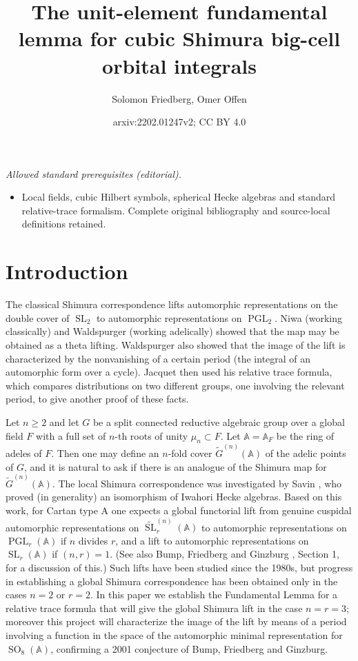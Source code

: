 \documentclass[12pt]{amsart}
\title{The unit-element fundamental lemma for cubic Shimura big-cell orbital integrals}
\author{Solomon Friedberg, Omer Offen}
\date{arxiv:2202.01247v2; CC BY 4.0}
\newcommand{\PGL}{\operatorname{PGL}}
\newcommand{\SL}{\operatorname{SL}}
\newcommand{\SO}{\operatorname{SO}}
\newcommand{\A}{\mathbb{A}}
\theoremstyle{remark}
\begin{document}
\maketitle
\noindent\textit{Allowed standard prerequisites (editorial).}\begin{itemize}
\item Local fields, cubic Hilbert symbols, spherical Hecke algebras and standard relative-trace formalism. Complete original bibliography and source-local definitions retained.
\end{itemize}\medskip
\section{Introduction} \label{intro}

The classical Shimura correspondence \cite{MR0332663} lifts automorphic representations on the double cover of $\SL_2$ to automorphic representations on $\PGL_2$.  Niwa \cite{MR0364106} (working classically) and 
Waldspurger \cite{MR577010} (working adelically) showed that the map may be obtained as a theta lifting. Waldspurger 
also showed that the image of the lift is characterized by the nonvanishing of a certain period (the integral of an automorphic form over a cycle). Jacquet \cite{MR983610} then used his relative trace formula, 
which compares distributions on two different groups, one involving the relevant period, to give another proof of these facts.  


Let  $n\geq2$ and let $G$ be a split connected reductive algebraic group over a global field $F$ with a full
set of $n$-th roots of unity $\mu_n\subset F$.  Let  $\A=\A_F$ be the ring of adeles of $F$. 
Then one may define an $n$-fold cover $\widetilde{G}^{(n)}(\mathbb{A})$ of the adelic points of $G$, and it is natural to ask if there is an analogue of the Shimura map for $\widetilde{G}^{(n)}(\mathbb{A})$. 
The local Shimura correspondence was investigated by Savin \cite{MR929534}, who proved (in generality) an isomorphism of Iwahori Hecke algebras.
Based on this work, for Cartan type A one expects a global functorial lift from genuine cuspidal automorphic representations on $\widetilde{\SL}_r^{(n)}(\A)$ to automorphic
representations on $\PGL_r(\A)$ if $n$ divides $r$, and a lift to automorphic representations on $\SL_r(\A)$ if $(n,r)=1$. (See also
 Bump, Friedberg and Ginzburg \cite{MR1882041}, Section 1, for a discussion of this.)   Such lifts have been studied since the 1980s,  but progress in establishing a global Shimura
 correspondence has been obtained only in the cases $n=2$ or $r=2$.
In this paper we establish the Fundamental Lemma for a relative trace formula
that will give the global Shimura lift in the case $n=r=3$; moreover this project will
characterize the image of the lift by means of a period involving a function in the space of the automorphic minimal representation for $\SO_8(\A)$, confirming a 2001 conjecture of Bump, Friedberg and Ginzburg.
\end{document}
